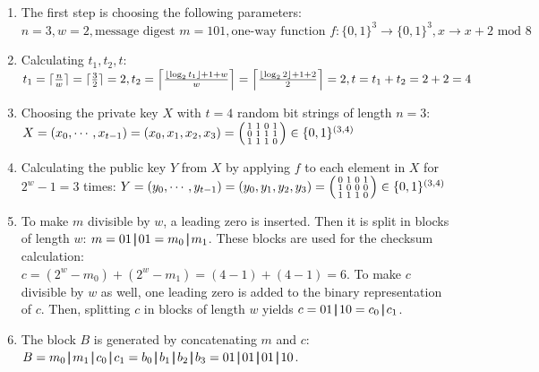 \begin{enumerate}

\item The first step is choosing the following parameters:
$n=3, w=2, \text{message digest } m = 101, {\text{one-way function } f:\{0,1\}^{3} \rightarrow \{0,1\}^{3}, x \rightarrow x+2 \text{ mod } 8}$

\item Calculating $t_1, t_2, t$: \\
$t_1 = \ceil{\frac{n}{w}} = \ceil{\frac{3}{2}} = 2, t_2 = \ceil*{\frac{\floor*{\log_2 t_1} + 1 + w}{w} } = \ceil*{\frac{\floor*{\log_2 2} + 1 + 2}{2} } = 2, {t = t_1 + t_2 = 2+2 = 4}$

\item Choosing the private key $X$ with $t=4$ random bit strings of length $n=3$: \\
$X = (x_0, \cdots, x_{t-1}) = (x_0, x_1, x_2, x_3) = 
\begin{psmallmatrix}
1 & 1 & 0 & 1\\
0 & 1 & 1 & 1\\
1 & 1 & 1 & 0
\end{psmallmatrix} \in \{0,1\}^{(3,4)} $

\item Calculating the public key $Y$ from $X$ by applying $f$ to each element in $X$ for $2^w-1 = 3$ times:	
$Y = (y_0, \cdots, y_{t-1}) = (y_0, y_1, y_2, y_3) = 
\begin{psmallmatrix}
0 & 1 & 0 & 1 \\
1 & 0 & 0 & 0 \\
1 & 1 & 1 & 0
\end{psmallmatrix} \in \{0,1\}^{(3,4)} $ 

\item To make $m$ divisible by $w$, a leading zero is inserted. Then it is split in blocks of length $w$: $m = 01 \concat 01 = m_0 \concat m_1$. These blocks are used for the checksum calculation: \\ $c = (2^w - m_0) + (2^w - m_1) = (4-1)+(4-1)=6$. To make $c$ divisible by $w$ as well, one leading zero is added to the binary representation of $c$. Then, splitting $c$ in blocks of length $w$ yields $c = 01 \concat 10 = c_0 \concat c_1$.

\item The block $B$ is generated by concatenating $m$ and $c$: \\ $B = m_0 \concat m_1 \concat c_0 \concat c_1 = b_0 \concat b_1 \concat b_2 \concat b_3 = 01 \concat 01 \concat 01 \concat 10 $.


\end{enumerate}
